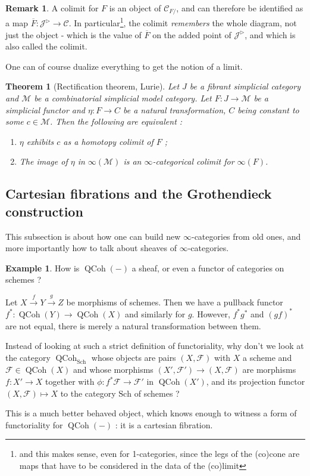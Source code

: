 \documentclass[11pt]{article}
\newtheorem{theorem}{Theorem}
\theoremstyle{definition}
\newtheorem{remark}{Remark}
\newtheorem{example}{Example}
\newcommand{\C}{\mathcal{C}}
\newcommand{\J}{\mathcal{J}}
\newcommand{\M}{\mathscr{M}}
\newcommand{\QCoh}{\operatorname{QCoh}}
\begin{document}
\begin{remark}
    A colimit for $F$ is an object of $\C_{F/}$, and can therefore be identified as a map $\overline{F} : \J^{\triangleright} \to \C$.
    In particular\footnote{and this makes sense, even for 1-categories, since the legs of the (co)cone are maps that have to be considered in the data of the (co)limit}, the colimit \emph{remembers} the whole diagram, not just the object - which is the value of $\overline{F}$ on the added point of $\J^{\triangleright}$, and which is also called the colimit.
\end{remark}

One can of course dualize everything to get the notion of a limit.

\begin{theorem}[Rectification theorem, Lurie]
    Let $J$ be a fibrant simplicial category and $\M$ be a combinatorial simplicial model category.
    Let $F : J \to \M$ be a simplicial functor and $\eta : F \to C$ be a natural transformation, $C$ being constant to some $c \in \M$.
    Then the following are equivalent :
    \begin{enumerate}
        \item $\eta$ exhibits $c$ as a homotopy colimit of $F$ ;
        \item The image of $\eta$ in $\infty(\M)$ is an $\infty$-categorical colimit for $\infty(F)$.
    \end{enumerate}
\end{theorem}

\subsection{Cartesian fibrations and the Grothendieck construction}

This subsection is about how one can build new $\infty$-categories from old ones, and more importantly how to talk about sheaves of $\infty$-categories.

\begin{example}
    How is $\QCoh(-)$ a sheaf, or even a functor of categories on schemes ?

    Let $X \xrightarrow{f} Y \xrightarrow{g} Z$ be morphisms of schemes.
    Then we have a pullback functor $f^* : \QCoh(Y) \to \QCoh(X)$ and similarly for $g$.
    However, $f^*g^*$ and $(gf)^*$ are not equal, there is merely a natural transformation between them.

    Instead of looking at such a strict definition of functoriality, why don't we look at the category $\QCoh_{\mathrm{Sch}}$ whose objects are pairs $(X, \mathcal{F})$ with $X$ a scheme and $\mathcal{F} \in \QCoh(X)$ and whose morphisms $(X', \mathcal{F}') \to (X, \mathcal{F})$ are morphisms $f : X' \to X$ together with $\phi : f^*\mathcal{F} \to \mathcal{F}'$ in $\QCoh(X')$, and its projection functor $(X, \mathcal{F}) \mapsto X$ to the category $\mathrm{Sch}$ of schemes ?

    This is a much better behaved object, which knows enough to witness a form of functoriality for $\QCoh(-)$ : it is a cartesian fibration.
\end{example}
\end{document}

